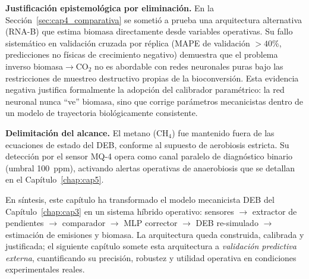\textbf{Justificación epistemológica por eliminación.} En la Sección~\ref{sec:cap4_comparativa} se sometió a prueba una arquitectura alternativa (RNA-B) que estima biomasa directamente desde variables operativas. Su fallo sistemático en validación cruzada por réplica (MAPE de validación $> 40$\%, predicciones no físicas de crecimiento negativo) demuestra que el problema inverso biomasa$\rightarrow$CO$_2$ no es abordable con redes neuronales puras bajo las restricciones de muestreo destructivo propias de la bioconversión. Esta evidencia negativa justifica formalmente la adopción del calibrador paramétrico: la red neuronal nunca ``ve'' biomasa, sino que corrige parámetros mecanicistas dentro de un modelo de trayectoria biológicamente consistente.

\textbf{Delimitación del alcance.} El metano (CH$_4$) fue mantenido fuera de las ecuaciones de estado del DEB, conforme al supuesto de aerobiosis estricta. Su detección por el sensor MQ-4 opera como canal paralelo de diagnóstico binario (umbral 100~ppm), activando alertas operativas de anaerobiosis que se detallan en el Capítulo~\ref{chap:cap5}.

En síntesis, este capítulo ha transformado el modelo mecanicista DEB del Capítulo~\ref{chap:cap3} en un sistema híbrido operativo: sensores $\rightarrow$ extractor de pendientes $\rightarrow$ comparador $\rightarrow$ MLP corrector $\rightarrow$ DEB re-simulado $\rightarrow$ estimación de emisiones y biomasa. La arquitectura queda construida, calibrada y justificada; el siguiente capítulo somete esta arquitectura a \emph{validación predictiva externa}, cuantificando su precisión, robustez y utilidad operativa en condiciones experimentales reales.
